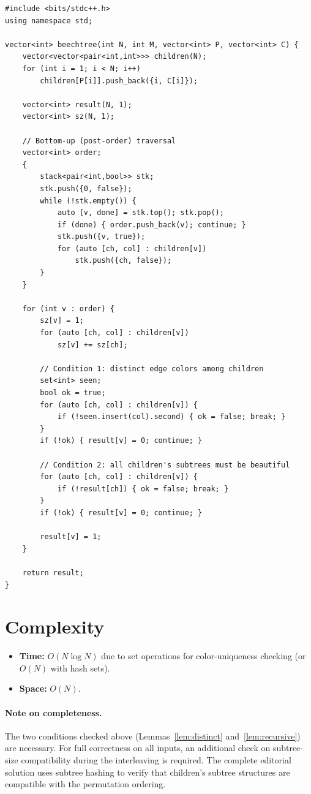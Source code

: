 \documentclass[11pt,a4paper]{article}
\begin{document}
\begin{lstlisting}
#include <bits/stdc++.h>
using namespace std;

vector<int> beechtree(int N, int M, vector<int> P, vector<int> C) {
    vector<vector<pair<int,int>>> children(N);
    for (int i = 1; i < N; i++)
        children[P[i]].push_back({i, C[i]});

    vector<int> result(N, 1);
    vector<int> sz(N, 1);

    // Bottom-up (post-order) traversal
    vector<int> order;
    {
        stack<pair<int,bool>> stk;
        stk.push({0, false});
        while (!stk.empty()) {
            auto [v, done] = stk.top(); stk.pop();
            if (done) { order.push_back(v); continue; }
            stk.push({v, true});
            for (auto [ch, col] : children[v])
                stk.push({ch, false});
        }
    }

    for (int v : order) {
        sz[v] = 1;
        for (auto [ch, col] : children[v])
            sz[v] += sz[ch];

        // Condition 1: distinct edge colors among children
        set<int> seen;
        bool ok = true;
        for (auto [ch, col] : children[v]) {
            if (!seen.insert(col).second) { ok = false; break; }
        }
        if (!ok) { result[v] = 0; continue; }

        // Condition 2: all children's subtrees must be beautiful
        for (auto [ch, col] : children[v]) {
            if (!result[ch]) { ok = false; break; }
        }
        if (!ok) { result[v] = 0; continue; }

        result[v] = 1;
    }

    return result;
}
\end{lstlisting}

\section{Complexity}

\begin{itemize}
  \item \textbf{Time:} $O(N \log N)$ due to set operations for
        color-uniqueness checking (or $O(N)$ with hash sets).
  \item \textbf{Space:} $O(N)$.
\end{itemize}

\paragraph{Note on completeness.}  The two conditions checked above
(Lemmas~\ref{lem:distinct} and~\ref{lem:recursive}) are necessary.
For full correctness on all inputs, an additional check on subtree-size
compatibility during the interleaving is required.  The complete
editorial solution uses subtree hashing to verify that children's
subtree structures are compatible with the permutation ordering.
\end{document}
